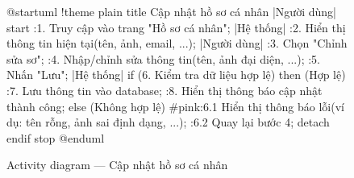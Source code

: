 \documentclass[12pt,a4paper]{report}
\begin{document}
\begin{figure}[H]
    \centering
    \begin{plantuml}
        @startuml
        !theme plain
        title Cập nhật hồ sơ cá nhân
        |Người dùng|
        start
        :1. Truy cập vào trang "Hồ sơ cá nhân";
        |Hệ thống|
        :2. Hiển thị thông tin hiện tại\n(tên, ảnh, email, ...);
        |Người dùng|
        :3. Chọn "Chỉnh sửa sơ";
        :4. Nhập/chỉnh sửa thông tin\n(tên, ảnh đại diện, ...);
        :5. Nhấn "Lưu";
        |Hệ thống|
        if (6. Kiểm tra dữ liệu hợp lệ) then (Hợp lệ)
          :7. Lưu thông tin vào database;
          :8. Hiển thị thông báo cập nhật thành công;
        else (Không hợp lệ)
          #pink:6.1 Hiển thị thông báo lỗi\n(ví dụ: tên rỗng, ảnh sai định dạng, ...);
          :6.2 Quay lại bước 4;
          detach
        endif
        stop
        @enduml
    \end{plantuml}
    \caption{Activity diagram --- Cập nhật hồ sơ cá nhân}
\end{figure}
\end{document}
